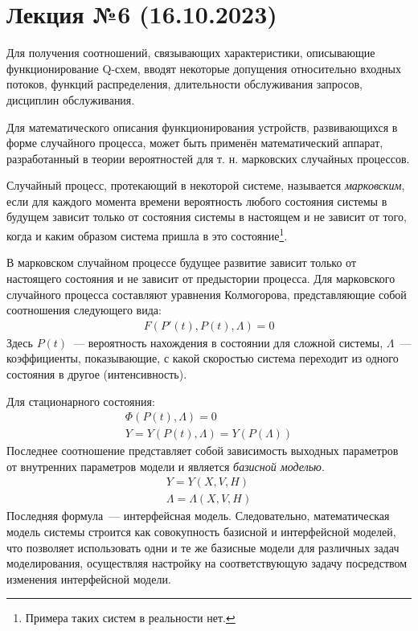 \section{Лекция №6 (16.10.2023)}

Для получения соотношений, связывающих характеристики, описывающие функционирование Q-схем, вводят некоторые допущения относительно входных потоков, функций распределения, длительности обслуживания запросов, дисциплин обслуживания.

Для математического описания функционирования устройств, развивающихся в форме случайного процесса, может быть применён математический аппарат, разработанный в теории вероятностей для т. н. марковских случайных процессов.

\begin{dd}
    Случайный процесс, протекающий в некоторой системе, называется \textit{марковским}, если для каждого момента времени вероятность любого состояния системы в будущем зависит только от состояния системы в настоящем и не зависит от того, когда и каким образом система пришла в это состояние\footnote{Примера таких систем в реальности нет.}.
\end{dd}

В марковском случайном процессе будущее развитие зависит только от настоящего состояния и не зависит от предыстории процесса. Для марковского случайного процесса составляют уравнения Колмогорова, представляющие собой соотношения следующего вида:
%
\begin{gather*}
    F(P'(t), P(t), \Lambda) = 0
\end{gather*}
%
Здесь $P(t)$~--- вероятность нахождения в состоянии для сложной системы, $\Lambda$~--- коэффициенты, показывающие, с какой скоростью система переходит из одного состояния в другое (интенсивность).

Для стационарного состояния:
%
\begin{gather*}
    \Phi(P(t), \Lambda) = 0\\
    Y = Y(P(t), \Lambda) = Y(P(\Lambda))
\end{gather*}
%
Последнее соотношение представляет собой зависимость выходных параметров от внутренних параметров модели и является \textit{базисной моделью}.
%
\begin{gather*}
    Y = Y(X, V, H)\\
    \Lambda= \Lambda(X, V, H)
\end{gather*}
%
Последняя формула~--- интерфейсная модель. Следовательно, математическая модель системы строится как совокупность базисной и интерфейсной моделей, что позволяет использовать одни и те же базисные модели для различных задач моделирования, осуществляя настройку на соответствующую задачу посредством изменения интерфейсной модели.

